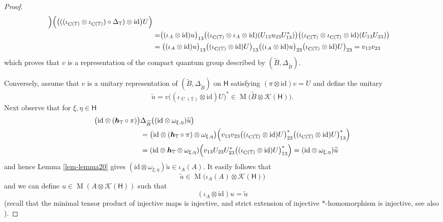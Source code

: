 \documentclass[12pt,reqno,a4paper]{amsart}
\theoremstyle{definition}
\newcommand{\comp}{\circ}
\newcommand{\id}{\mathrm{id}}
\newcommand{\tens}{\otimes}
\newcommand{\TT}{\mathbb{T}}
\newcommand{\cK}{\mathscr{K}}
\newcommand{\sH}{\mathsf{H}}
\newcommand{\bh}{{\boldsymbol{h}}}
\DeclareMathOperator{\C}{C}
\DeclareMathOperator{\M}{M}
\numberwithin{equation}{section}
\begin{document}
\begin{proof}
\begin{equation}
{{\begin{aligned}
\Bigr)
\Bigl(
\bigl(((\iota_{\C(\TT)}\tens\iota_{\C(\TT)})\comp\Delta_\TT)\tens\id\bigr)U
\Bigr)\\
&=\bigr((\iota_A\tens\id)u\bigr)_{13}
\bigl((\iota_{\C(\TT)}\tens\iota_A\tens\id)(U_{13}u_{23}U_{13}^*)\bigr)
\bigl((\iota_{\C(\TT)}\tens\iota_{\C(\TT)}\tens\id)(U_{13}U_{23})\bigr)\\
&=\bigl((\iota_A\tens\id)u\bigr)_{13}
\bigl((\iota_{\C(\TT)}\tens\id)U\bigr)_{13}
\bigl((\iota_A\tens\id)u\bigr)_{23}
\bigl(\iota_{\C(\TT)}\tens\id)U\bigr)_{23}
=v_{13}v_{23}
\end{aligned}
}}
\end{equation}
which proves that $v$ is a representation of the compact quantum group described by $(\widetilde{B},\Delta_{\widetilde{B}})$.

Conversely, assume that $v$ is a unitary representation of $(\widetilde{B},\Delta_{\widetilde{B}})$ on $\sH$ satisfying $(\pi\tens\id)v=U$ and define the unitary
\[
\widetilde{u}=v\bigl((\iota_{\C(\TT)}\tens\id)U\bigr)^*\in
\M\bigl(\widetilde{B}\tens\cK(\sH)\bigr).
\]
Next observe that for $\xi,\eta\in\sH$
\begin{align*}
\bigl(\id\tens(\bh_\TT\comp\pi)\bigr)
&\Delta_{\widetilde{B}}\bigl((\id\tens\omega_{\xi,\eta})\widetilde{u}\bigr)\\
&=\bigl(\id\tens(\bh_{\TT}\comp\pi)\tens\omega_{\xi,\eta}\bigr)
\Bigl(v_{13}v_{23}
\bigl((\iota_{\C(\TT)}\tens\id)U\bigr)^*_{23}
\bigl((\iota_{\C(\TT)}\tens\id)U\bigr)^*_{13}\Bigr)\\
&=(\id\tens\bh_\TT\tens\omega_{\xi,\eta})
\Bigl(v_{13}U_{23}U^*_{23}
\bigl((\iota_{\C(\TT)}\tens\id)U\bigr)^*_{13}
\Bigr)
=(\id\tens\omega_{\xi,\eta})\widetilde{u}
\end{align*}
and hence Lemma \ref{lem-lemma20} gives $(\id\tens\omega_{\xi,\eta})\widetilde{u}\in \iota_A(A)$. It easily follows that
\[
\widetilde{u}\in\M\bigl(\iota_A(A)\tens\cK(\sH)\bigr)
\]
and we can define $u\in\M(A\tens\cK(\sH))$ such that
\[
(\iota_A\tens\id)u=\widetilde{u}
\]
(recall that the minimal tensor product of injective maps is injective, and strict extension of injective $*$-homomorphism is injective, see also \cite[Proposition 2.3]{Lance}).


\end{proof}
\end{document}
